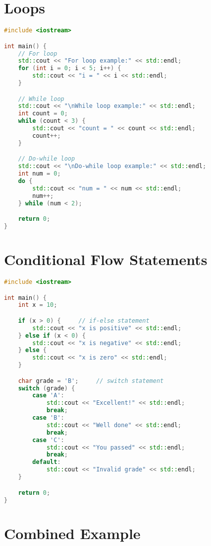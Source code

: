 \documentclass[a4paper,12pt]{article}
\begin{document}
\section{Loops}

\begin{lstlisting}[language=C++, caption={Examples of different loop constructs}]
#include <iostream>

int main() {
    // For loop
    std::cout << "For loop example:" << std::endl;
    for (int i = 0; i < 5; i++) {
        std::cout << "i = " << i << std::endl;
    }

    // While loop
    std::cout << "\nWhile loop example:" << std::endl;
    int count = 0;
    while (count < 3) {
        std::cout << "count = " << count << std::endl;
        count++;
    }

    // Do-while loop
    std::cout << "\nDo-while loop example:" << std::endl;
    int num = 0;
    do {
        std::cout << "num = " << num << std::endl;
        num++;
    } while (num < 2);

    return 0;
}
\end{lstlisting}

\section{Conditional Flow Statements}

\begin{lstlisting}[language=C++, caption={Examples of if/else and switch statements}]
#include <iostream>

int main() {
    int x = 10;

    if (x > 0) {     // if-else statement
        std::cout << "x is positive" << std::endl;
    } else if (x < 0) {
        std::cout << "x is negative" << std::endl;
    } else {
        std::cout << "x is zero" << std::endl;
    }

    char grade = 'B';     // switch statement
    switch (grade) {
        case 'A':
            std::cout << "Excellent!" << std::endl;
            break;
        case 'B':
            std::cout << "Well done" << std::endl;
            break;
        case 'C':
            std::cout << "You passed" << std::endl;
            break;
        default:
            std::cout << "Invalid grade" << std::endl;
    }

    return 0;
}
\end{lstlisting}

\section{Combined Example}
\end{document}
